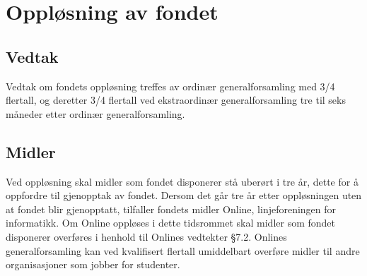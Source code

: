 \chapter{Oppløsning av fondet}

\section{Vedtak}

Vedtak om fondets oppløsning treffes av ordinær generalforsamling med 3/4 flertall, og deretter 3/4 flertall ved ekstraordinær generalforsamling tre til seks måneder etter ordinær generalforsamling.

\section{Midler}

Ved oppløsning skal midler som fondet disponerer stå uberørt i tre år, dette for å oppfordre til gjenopptak av fondet. Dersom det går tre år etter oppløsningen uten at fondet blir gjenopptatt, tilfaller fondets midler Online, linjeforeningen for informatikk. Om Online oppløses i dette tidsrommet skal midler som fondet disponerer overføres i henhold til Onlines vedtekter §7.2.
Onlines generalforsamling kan ved kvalifisert flertall umiddelbart overføre midler til andre organisasjoner som jobber for studenter.
